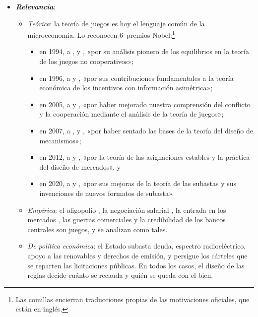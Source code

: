\documentclass[11pt]{article}
\begin{document}
\begin{itemize}
\item \textbf{\emph{Relevancia}}:
  \begin{itemize}
  \item \emph{Teórica}: la teoría de juegos es hoy el lenguaje común de la microeconomía. Lo reconocen 6~premios Nobel:\footnote{Las comillas encierran traducciones propias de las motivaciones oficiales, que están en inglés.}
    \begin{itemize}
    \item en 1994, a ,  y , «por su análisis pionero de los equilibrios en la teoría de los juegos no cooperativos»\nocite{Nobel1994Nash};
    \item en 1996, a  y , «por sus contribuciones fundamentales a la teoría económica de los incentivos con información asimétrica»\nocite{Nobel1996MirrleesVickrey};
    \item en 2005, a  y , «por haber mejorado nuestra comprensión del conflicto y la cooperación mediante el análisis de la teoría de juegos»\nocite{Nobel2005AumannSchelling};
    \item en 2007, a ,  y , «por haber sentado las bases de la teoría del diseño de mecanismos»\nocite{Nobel2007HurwiczMaskinMyerson};
    \item en 2012, a  y , «por la teoría de las asignaciones estables y la práctica del diseño de mercados»\nocite{Nobel2012RothShapley}, y
    \item en 2020, a  y , «por sus mejoras de la teoría de las subastas y sus invenciones de nuevos formatos de subasta»\nocite{Nobel2020MilgromWilson}.
    \end{itemize}
  \item \emph{Empírica}: el oligopolio , la negociación salarial , la entrada en los mercados , las guerras comerciales  y la credibilidad de los bancos centrales  son juegos, y se analizan como tales.
  \item \emph{De política económica}: el Estado subasta deuda, espectro radioeléctrico, apoyo a las renovables y derechos de emisión, y persigue los cárteles que se reparten las licitaciones públicas. En todos los casos, el diseño de las reglas decide cuánto se recauda y quién se queda con el bien.
  \end{itemize}


\end{itemize}
\end{document}
